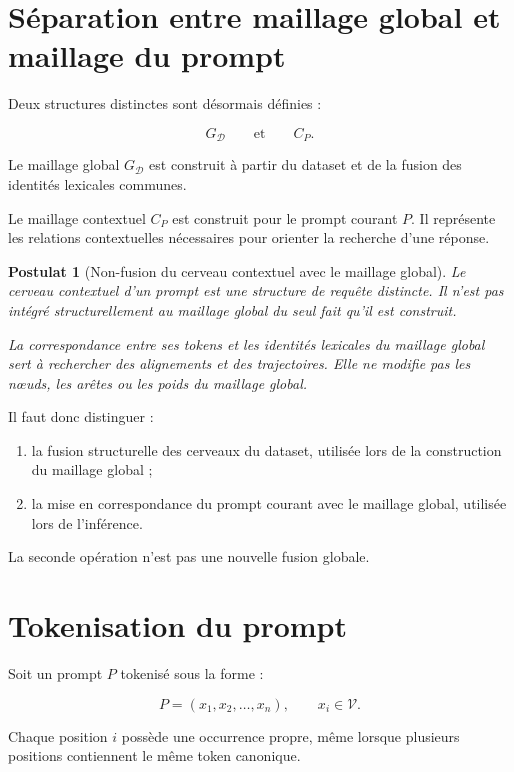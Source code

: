 \documentclass[11pt,a4paper,oneside]{book}
\newtheorem{postulat}[definition]{Postulat}
\theoremstyle{remark}
\newcommand{\Dataset}{\mathcal{D}}
\newcommand{\Tokens}{\mathcal{V}}
\begin{document}
\section{Séparation entre maillage global et maillage du prompt}

Deux structures distinctes sont désormais définies :

\[
G_{\Dataset}
\qquad\text{et}\qquad
C_P.
\]

Le maillage global \(G_{\Dataset}\) est construit à partir du dataset
et de la fusion des identités lexicales communes.

Le maillage contextuel \(C_P\) est construit pour le prompt courant
\(P\). Il représente les relations contextuelles nécessaires pour
orienter la recherche d'une réponse.

\begin{postulat}[Non-fusion du cerveau contextuel avec le maillage global]
Le cerveau contextuel d'un prompt est une structure de requête
distincte. Il n'est pas intégré structurellement au maillage global
du seul fait qu'il est construit.

La correspondance entre ses tokens et les identités lexicales du
maillage global sert à rechercher des alignements et des trajectoires.
Elle ne modifie pas les nœuds, les arêtes ou les poids du maillage
global.
\end{postulat}

Il faut donc distinguer :

\begin{enumerate}
  \item la fusion structurelle des cerveaux du dataset, utilisée
        lors de la construction du maillage global ;
  \item la mise en correspondance du prompt courant avec le maillage
        global, utilisée lors de l'inférence.
\end{enumerate}

La seconde opération n'est pas une nouvelle fusion globale.

\section{Tokenisation du prompt}

Soit un prompt \(P\) tokenisé sous la forme :

\[
P=(x_1,x_2,\ldots,x_n),
\qquad x_i\in\Tokens.
\]

Chaque position \(i\) possède une occurrence propre, même lorsque
plusieurs positions contiennent le même token canonique.
\end{document}
